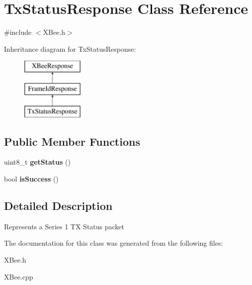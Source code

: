 \hypertarget{classTxStatusResponse}{\section{\-Tx\-Status\-Response \-Class \-Reference}
\label{classTxStatusResponse}
}


{\ttfamily \#include $<$\-X\-Bee.\-h$>$}

\-Inheritance diagram for \-Tx\-Status\-Response\-:\begin{figure}[H]
\begin{center}
\leavevmode
\includegraphics[height=3.000000cm]{classTxStatusResponse}
\end{center}
\end{figure}
\subsection*{\-Public \-Member \-Functions}
\begin{DoxyCompactItemize}
\item 
\hypertarget{classTxStatusResponse_ac6670f7b35b65d9d032c8c4689617569}{uint8\-\_\-t {\bfseries get\-Status} ()}\label{classTxStatusResponse_ac6670f7b35b65d9d032c8c4689617569}

\item 
\hypertarget{classTxStatusResponse_ab5a35099727e48e2a3db12d844881607}{bool {\bfseries is\-Success} ()}\label{classTxStatusResponse_ab5a35099727e48e2a3db12d844881607}

\end{DoxyCompactItemize}


\subsection{\-Detailed \-Description}
\-Represents a \-Series 1 \-T\-X \-Status packet 

\-The documentation for this class was generated from the following files\-:\begin{DoxyCompactItemize}
\item 
\-X\-Bee.\-h\item 
\-X\-Bee.\-cpp\end{DoxyCompactItemize}
